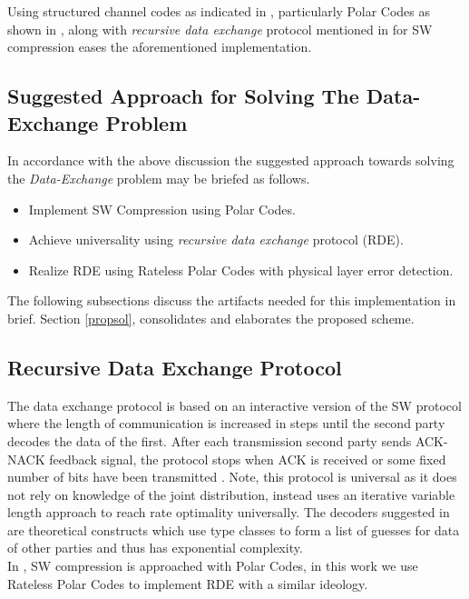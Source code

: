 \documentclass[
11pt, %
a4paper, %
oneside, %
headinclude,footinclude, %
BCOR5mm, %
]{scrartcl}
\begin{document}
Using structured channel codes as indicated in \cite{discus}, particularly Polar Codes as shown in \cite{pslep}, along with \emph{recursive data exchange} protocol  mentioned in \cite{htsw} for SW compression eases the aforementioned implementation. 

\subsection{Suggested Approach for Solving The Data-Exchange Problem}\label{suggapp}
In accordance with the above discussion the suggested approach towards solving the \emph{Data-Exchange} problem may be briefed as follows.
\begin{itemize}
\item{Implement SW Compression using Polar Codes.}
\item{Achieve universality using \emph{recursive data exchange} protocol (RDE).}
\item{Realize RDE using Rateless Polar Codes with physical layer error detection.}
\end{itemize}

The following subsections discuss the artifacts needed for this implementation in brief. Section \ref{propsol}, consolidates and elaborates the proposed scheme. 

\subsection{Recursive Data Exchange Protocol}
The data exchange protocol is based on an interactive version of the SW protocol where the length of communication is increased in steps until the second party decodes the data of the first. After each transmission second party sends ACK-NACK feedback signal, the protocol stops when ACK is received or some fixed number of bits have been transmitted \cite{htsw}. Note, this protocol is universal as it does not rely on knowledge of the joint distribution, instead uses an iterative variable length approach to reach rate optimality universally. The decoders suggested in \cite{htsw} are theoretical constructs which use type classes to form a list of guesses for data of other parties and thus has exponential complexity.\\ In \cite{pslep}, SW compression is approached with Polar Codes, in this work we use Rateless Polar Codes to implement RDE with a similar ideology.
\clearpage
\end{document}
